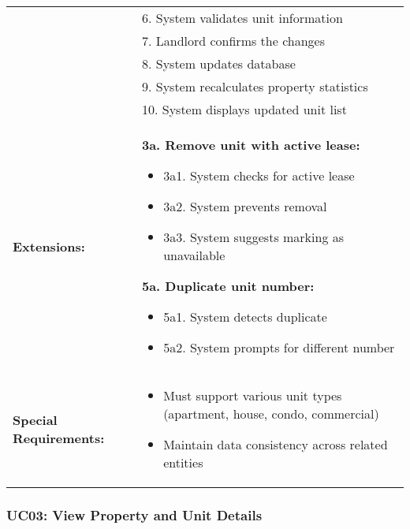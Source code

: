 \documentclass[12pt]{article}
\begin{document}
\begin{tabular}{|p{3cm}|p{11cm}|}
& 6. System validates unit information \\
& 7. Landlord confirms the changes \\
& 8. System updates database \\
& 9. System recalculates property statistics \\
& 10. System displays updated unit list \\
\hline
\textbf{Extensions:} & 
\textbf{3a. Remove unit with active lease:}
\begin{itemize}
    \item 3a1. System checks for active lease
    \item 3a2. System prevents removal
    \item 3a3. System suggests marking as unavailable
\end{itemize}
\textbf{5a. Duplicate unit number:}
\begin{itemize}
    \item 5a1. System detects duplicate
    \item 5a2. System prompts for different number
\end{itemize} \\
\hline
\textbf{Special Requirements:} & 
\begin{itemize}
    \item Must support various unit types (apartment, house, condo, commercial)
    \item Maintain data consistency across related entities
\end{itemize} \\
\hline
\end{tabular}

\subsubsection{UC03: View Property and Unit Details}
\end{document}
